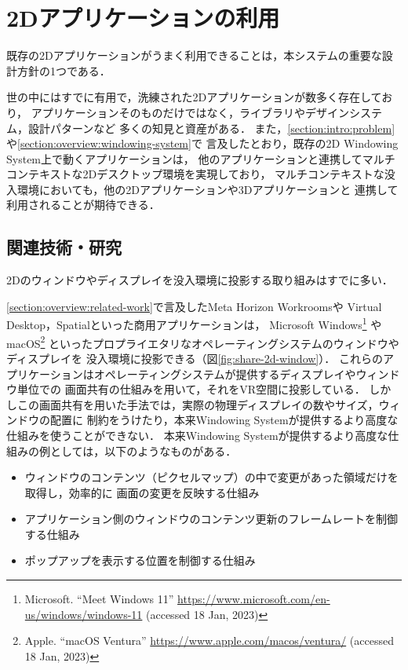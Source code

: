 \chapter{2Dアプリケーションの利用}
\label{chapter:2d}

既存の2Dアプリケーションがうまく利用できることは，本システムの重要な設計方針の1つである．

世の中にはすでに有用で，洗練された2Dアプリケーションが数多く存在しており，
アプリケーションそのものだけではなく，ライブラリやデザインシステム，設計パターンなど
多くの知見と資産がある．
また，\ref{section:intro:problem}や\ref{section:overview:windowing-system}で
言及したとおり，既存の2D Windowing System上で動くアプリケーションは，
他のアプリケーションと連携してマルチコンテキストな2Dデスクトップ環境を実現しており，
マルチコンテキストな没入環境においても，他の2Dアプリケーションや3Dアプリケーションと
連携して利用されることが期待できる．

\section{関連技術・研究}


2Dのウィンドウやディスプレイを没入環境に投影する取り組みはすでに多い．

\ref{section:overview:related-work}で言及したMeta Horizon Workroomsや
Virtual Desktop，Spatialといった商用アプリケーションは，
Microsoft Windows\footnote{Microsoft. ``Meet Windows 11'' \url{https://www.microsoft.com/en-us/windows/windows-11} (accessed 18 Jan, 2023)}
やmacOS\footnote{Apple. ``macOS Ventura'' \url{https://www.apple.com/macos/ventura/} (accessed 18 Jan, 2023)}
といったプロプライエタリなオペレーティングシステムのウィンドウやディスプレイを
没入環境に投影できる（図\ref{fig:share-2d-window}）．
これらのアプリケーションはオペレーティングシステムが提供するディスプレイやウィンドウ単位での
画面共有の仕組みを用いて，それをVR空間に投影している．
しかしこの画面共有を用いた手法では，実際の物理ディスプレイの数やサイズ，ウィンドウの配置に
制約をうけたり，本来Windowing Systemが提供するより高度な仕組みを使うことができない．
本来Windowing Systemが提供するより高度な仕組みの例としては，以下のようなものがある．

\begin{itemize}
  \item ウィンドウのコンテンツ（ピクセルマップ）の中で変更があった領域だけを取得し，効率的に
        画面の変更を反映する仕組み
  \item アプリケーション側のウィンドウのコンテンツ更新のフレームレートを制御する仕組み
  \item ポップアップを表示する位置を制御する仕組み
\end{itemize}

